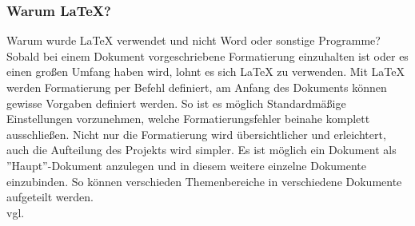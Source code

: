 \subsubsection{Warum LaTeX?} 
\label{sec:WarumLaTeX}
Warum wurde LaTeX verwendet und nicht Word oder sonstige Programme? Sobald bei einem Dokument vorgeschriebene Formatierung einzuhalten ist oder es einen großen Umfang haben wird, lohnt es sich LaTeX zu verwenden. Mit LaTeX werden Formatierung per Befehl definiert, am Anfang des Dokuments können gewisse Vorgaben definiert werden. So ist es möglich Standardmäßige Einstellungen vorzunehmen, welche Formatierungsfehler beinahe komplett ausschließen. Nicht nur die Formatierung wird übersichtlicher und erleichtert, auch die Aufteilung des Projekts wird simpler. Es ist möglich ein Dokument als ''Haupt''-Dokument anzulegen und in diesem weitere einzelne Dokumente einzubinden. So können verschieden Themenbereiche in verschiedene Dokumente aufgeteilt werden. \\vgl. \cite{TechnologieLaTeX} 